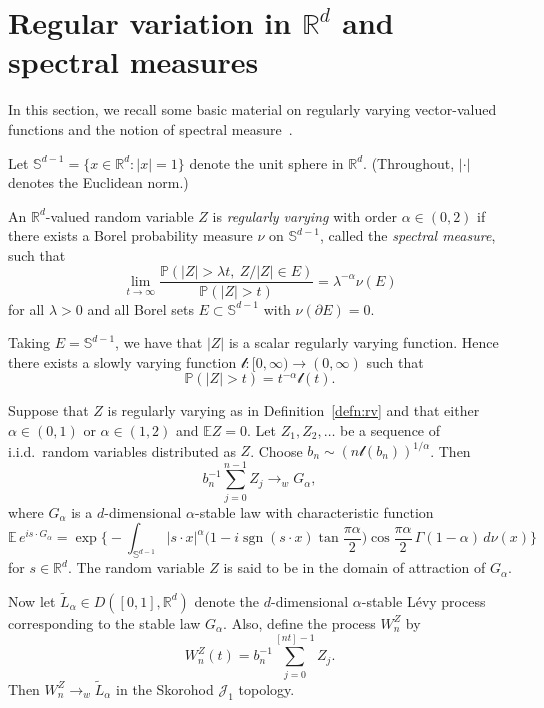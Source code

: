 \documentclass[12pt]{article}
\numberwithin{equation}{section}
\newcommand{\R}{{\mathbb R}}
\newcommand{\E}{{\mathbb E}}
\newcommand{\PP}{{\mathbb P}}
\newcommand{\bbS}{{\mathbb S}}
\newcommand{\cJ}{{\mathcal J}}
\newcommand{\tL}{{\tilde L}}
\newcommand{\sgn}{\operatorname{sgn}}
\begin{document}
\section{Regular variation in $\R^d$ and spectral measures}
\label{sec:rv}

In this section, we recall some basic material on regularly varying vector-valued functions and the notion of spectral measure~\cite[Section~2.3]{SamorodnitskyTaqqu}.


Let $\bbS^{d-1} = \{x \in \R^d : |x| = 1 \}$ denote the unit sphere in $\R^d$.
(Throughout, $|\cdot|$ denotes the Euclidean norm.)

\begin{defn} \label{defn:rv}
An $\R^d$-valued random variable $Z$ is
    \emph{regularly varying} with order $\alpha\in(0,2)$ if
    there exists a Borel probability measure $\nu$
    on
    $\bbS^{d-1}$, called the \emph{spectral measure}, such that
\[
        \lim_{t \to \infty}
        \frac{\PP(|Z| > \lambda t, \ Z / |Z| \in E)}{\PP(|Z| > t)}
        = \lambda^{-\alpha} \nu(E)
\]
    for all $\lambda > 0$ and all Borel sets $E \subset \bbS^{d-1}$ with $\nu(\partial E) = 0$.
\end{defn}

Taking $E=\bbS^{d-1}$, we have that $|Z|$ is a scalar regularly varying
function.
Hence there exists a slowly varying function $\mathcal{l}:[0,\infty)\to(0,\infty)$
such that 
\[
\PP(|Z|>t)=t^{-\alpha}\mathcal{l}(t).
\]

Suppose that $Z$ is regularly varying as in Definition~\ref{defn:rv} and that
either $\alpha\in(0,1)$ or $\alpha\in(1,2)$ and
$\E Z=0$. 
Let $Z_1,Z_2,\ldots$ be a sequence of i.i.d.\ random variables distributed as $Z$. Choose $b_n\sim (n\mathcal{l}(b_n))^{1/\alpha}$. Then
\[
b_n^{-1}\sum_{j=0}^{n-1}Z_j   \to_w G_\alpha,
\]
where 
$G_\alpha$ is a $d$-dimensional $\alpha$-stable law with 
characteristic function
\[
\E\, e^{is\cdot G_\alpha}= \exp\Big\{-\int_{\bbS^{d-1}}|s\cdot x|^\alpha\Big(1-i\sgn(s\cdot x)
\tan\frac{\pi\alpha}{2}\Big)\cos\frac{\pi\alpha}{2}\,\Gamma(1-\alpha)\,d\nu(x)\Big\}
\]
for $s\in\R^d$. The random variable $Z$ is said to be in the domain of attraction of $G_\alpha$.

Now let $\tL_\alpha\in D([0,1],\R^d)$ denote the $d$-dimensional $\alpha$-stable L\'evy process corresponding to the stable law $G_\alpha$.
Also, define the process $W_n^Z$ by
\[
W^Z_n(t)=b_n^{-1}\sum_{j=0}^{[nt]-1}Z_j .
\]
Then $W^Z_n\to_w \tL_\alpha$ in the Skorohod $\cJ_1$ topology.
\end{document}
